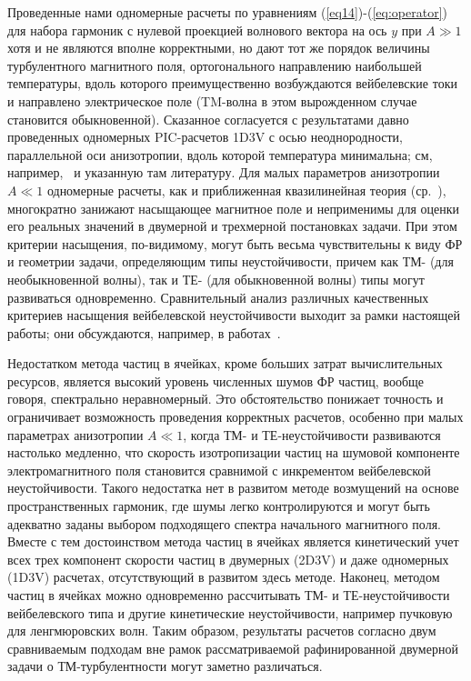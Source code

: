 Проведенные нами одномерные расчеты по уравнениям (\ref{eq14})-(\ref{eq:operator}) для набора гармоник с нулевой проекцией волнового вектора на ось $y$ при $A \gg 1$ хотя и не являются вполне корректными, но дают тот же порядок величины турбулентного магнитного поля, ортогонального направлению наибольшей температуры, вдоль которого преимущественно возбуждаются вейбелевские токи и направлено электрическое поле (TM-волна в этом вырожденном случае становится обыкновенной). Сказанное согласуется с результатами давно проведенных одномерных PIC-расчетов 1D3V с осью неоднородности, параллельной оси анизотропии, вдоль которой температура минимальна; см, например,~\cite{Lemons1979,Stockem2010,Seough2015} и указанную там литературу. 
Для малых параметров анизотропии $A \ll 1$ одномерные расчеты, как и приближенная квазилинейная теория (ср.~\cite{Pokhotelov2011, Dieckmann2009, Ruyer2015}), многократно занижают насыщающее магнитное поле и неприменимы для оценки его реальных значений в двумерной и трехмерной постановках задачи. При этом критерии насыщения, по-видимому, могут быть весьма чувствительны к виду ФР и геометрии задачи, определяющим типы неустойчивости, причем как ТМ- (для необыкновенной волны), так и ТЕ- (для обыкновенной волны) типы могут развиваться одновременно. Сравнительный анализ различных качественных критериев насыщения вейбелевской неустойчивости выходит за рамки настоящей работы; они обсуждаются, например, в работах~\cite{Kocharovsky2016, Kato2005, Stockem2009,Stockem2010,YOON2011}.

Недостатком метода частиц в ячейках, кроме больших затрат вычислительных ресурсов, является высокий уровень численных шумов ФР частиц, вообще говоря, спектрально неравномерный. Это обстоятельство понижает точность и ограничивает возможность проведения корректных расчетов, особенно при малых параметрах анизотропии $A \ll 1$, когда ТМ- и ТЕ-неустойчивости развиваются настолько медленно, что скорость изотропизации частиц на шумовой компоненте электромагнитного поля становится сравнимой с инкрементом вейбелевской неустойчивости. Такого недостатка нет в развитом методе возмущений на основе пространственных гармоник, где шумы легко контролируются и могут быть адекватно заданы выбором подходящего спектра начального магнитного поля. Вместе с тем достоинством метода частиц в ячейках является кинетический учет всех трех компонент скорости частиц в двумерных (2D3V) и даже одномерных (1D3V) расчетах, отсутствующий в развитом здесь методе. Наконец, методом частиц в ячейках можно одновременно рассчитывать ТМ- и ТЕ-неустойчивости вейбелевского типа и другие кинетические неустойчивости, например пучковую для ленгмюровских волн. Таким образом, результаты расчетов согласно двум сравниваемым подходам вне рамок рассматриваемой рафинированной двумерной задачи о ТМ-турбулентности могут заметно различаться.


